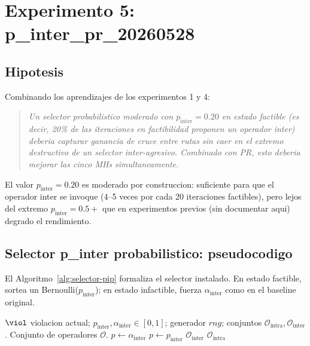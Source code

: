 \section{Experimento 5: p\_inter\_pr\_20260528}
\label{sec:exp-pip}

\subsection{Hipotesis}

Combinando los aprendizajes de los experimentos 1 y 4:

\begin{quote}
\textit{Un selector probabilistico moderado con $p_{\text{inter}} = 0.20$
en estado factible (es decir, 20\% de las iteraciones en factibilidad
proponen un operador inter) deberia capturar ganancia de cruce entre
rutas sin caer en el extremo destructivo de un selector inter-agresivo.
Combinado con PR, esto deberia mejorar las cinco MHs simultaneamente.}
\end{quote}

El valor $p_{\text{inter}} = 0.20$ es moderado por construccion:
suficiente para que el operador inter se invoque (4--5 veces por cada
20 iteraciones factibles), pero lejos del extremo $p_{\text{inter}} =
0.5+$ que en experimentos previos (sin documentar aqui) degrado el
rendimiento.

\subsection{Selector p\_inter probabilistico: pseudocodigo}

El Algoritmo~\ref{alg:selector-pip} formaliza el selector instalado.
En estado factible, sortea un Bernoulli($p_{\text{inter}}$); en estado
infactible, fuerza $\alpha_{\text{inter}}$ como en el baseline original.

\begin{algorithm}[h]
\caption{Selector p\_inter probabilistico.}
\label{alg:selector-pip}
\begin{algorithmic}[1]
\Require $\viol$ violacion actual; $p_{\text{inter}}, \alpha_{\text{inter}} \in [0,1]$;
  generador $rng$; conjuntos $\mathcal{O}_{\text{intra}}, \mathcal{O}_{\text{inter}}$.
\Ensure Conjunto de operadores $\mathcal{O}$.
  \State $p \gets \alpha_{\text{inter}}$
\Else
  \State $p \gets p_{\text{inter}}$
\EndIf
{}
  \State \Return $\mathcal{O}_{\text{inter}}$
\Else
  \State \Return $\mathcal{O}_{\text{intra}}$
\EndIf
\end{algorithmic}
\end{algorithm}

